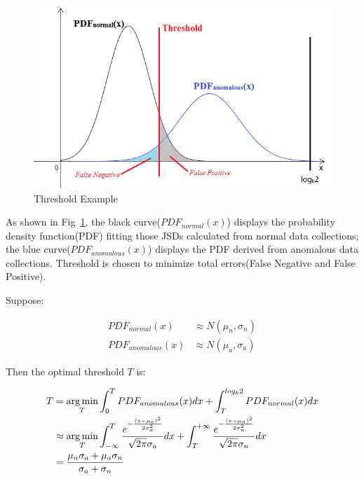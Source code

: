 \documentclass[a4paper]{IEEEtran}
\begin{document}
			\begin{figure}[!ht]
				\centering
				\includegraphics[width=\linewidth]{fig/ExampleThreshold.png}
				\caption{Threshold Example}
				\label{fig:example-threshold}
			\end{figure}
			
			As shown in Fig~\ref{fig:example-threshold}, the black curve($PDF_{normal}(x)$) displays the probability density function(PDF) fitting those JSDs calculated from normal data collections; the blue curve($PDF_{anomalous}(x)$) displays the PDF derived from anomalous data collections. Threshold is chosen to minimize total errors(False Negative and False Positive).
			
			Suppose:
			
			\begin{align}
				PDF_{normal}(x) &\approx N(\mu_n, \sigma_n)\\
				PDF_{anomalous}(x) &\approx N(\mu_a, \sigma_a)
			\end{align}
			
			Then the optimal threshold $T$ is:
			
			\begin{equation}\label{equ:linear-weight}
				\small
				\begin{split}
					T &= \mathop{\arg\min}_{T} \int_{0}^{T}PDF_{anomalous}(x)dx +
					 \int_{T}^{log_k2}PDF_{normal}(x)dx\\
					& \approx \mathop{\arg\min}_{T}
					\int_{-\infty}^{T}
					\frac{e^{-\frac{(x - \mu_a)^2}{2\sigma_a^2}}}{\sqrt{2\pi} \sigma_a}dx
					+ \int_{T}^{+\infty}
					\frac{e^{-\frac{(x - \mu_n)^2}{2\sigma_n^2}}}{\sqrt{2\pi} \sigma_n}dx\\
					& = \frac{\mu_n\sigma_a + \mu_a\sigma_n}{\sigma_a + \sigma_n}
				\end{split}
			\end{equation}
			
\end{document}
